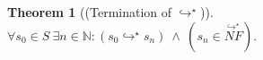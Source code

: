 \documentclass[a4paper,11pt,oneside]{article}
\theoremstyle{plain}
\newtheorem{theorem}[definition]{Theorem}
\newtheorem{corr}[definition]{Corrolary}
\renewenvironment{proof}{\noindent \textcolor{blue}{\textit{Proof.}}}
{{\begin{tiny}\textcolor{blue}{$\blacksquare$}\end{tiny}}\\}
\newcommand{\tmlet}[3]{let~#1=#2~in~#3}
\newcommand{\tmsbst}[3]{#1 [#2 \mapsfrom #3] }
\newcommand{\bwedge}{\boldsymbol{~\wedge~}}
\newcommand{\brarr}{\boldsymbol{~\Rightarrow~}}
\newcommand{\inlS}{\mathcal{S}}
\newcommand{\inlsrc}{\textit{ML}^{^2}}
\newcommand{\inlT}{\inlsrc}
\newcommand{\hookdownarrow}{\mathrel{\rotatebox[origin=c]{180}{$\hookleftarrow$}}}
\newcommand{\inlletarr}{\hookdownarrow}
\newcommand{\inlletstar}{\hookdownarrow^{\star}}
\newcommand{\inlletplus}{\inlletstar}
\newcommand{\inlletNF}{\overset{\inlletplus}{NF}}
\newcommand{\inllett}[2]{#1 \inlletplus #2}
\newcommand{\icarr}{\hookrightarrow}
\newcommand{\icarrt}{\icarr^{\star}}
\newcommand{\icNF}{\overset{\icarrt}{NF}}
\newcommand{\ict}[2]{#1 \icarrt #2}
\begin{document}
\begin{theorem}[(Termination of $\icarrt$)] 
		$\forall s_0 \in S ~
	 			\exists n \in \mathbb{N}:  
	 				  (\ict{s_0}{s_n}) \bwedge (s_n \in \icNF).$
\label{ic-term-l}
\end{theorem}
% 
%	
%	
%	
%
%	
%	


 
\end{document}
